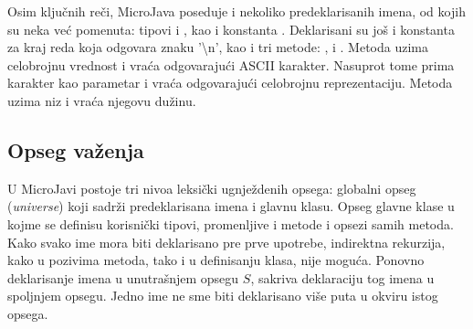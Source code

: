 Osim ključnih reči, MicroJava poseduje i nekoliko predeklarisanih imena, od kojih su neka već pomenuta: 
	tipovi  i , kao i konstanta . 
Deklarisani su još i konstanta za kraj reda  koja odgovara znaku '\textbackslash n', 
	kao i tri metode: ,  i . 
Metoda   uzima celobrojnu vrednost i vraća odgovarajući ASCII karakter. 
Nasuprot tome  prima karakter kao parametar i vraća odgovarajući celobrojnu reprezentaciju. 
Metoda  uzima niz i vraća njegovu dužinu. 

\subsection*{Opseg važenja}

U MicroJavi postoje tri nivoa leksički ugnježdenih opsega: globalni opseg (\textit{universe}) koji sadrži predeklarisana imena i glavnu klasu. 
Opseg glavne klase u kojme se definisu korisnički tipovi, promenljive i metode i opsezi samih metoda. 
Kako svako ime mora biti deklarisano pre prve upotrebe, indirektna rekurzija, kako u pozivima metoda, tako i u definisanju klasa, nije moguća. 
Ponovno deklarisanje imena u unutrašnjem opsegu $S$, sakriva deklaraciju tog imena u spoljnjem opsegu. 
Jedno ime ne sme biti deklarisano više puta u okviru istog opsega.
